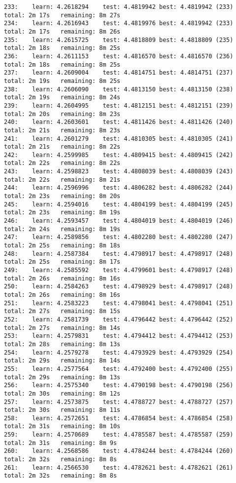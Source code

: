 \documentclass[11pt]{article}
\begin{document}
\begin{Verbatim}[commandchars=\\\{\}]
233:	learn: 4.2618294	test: 4.4819942	best: 4.4819942 (233)	total: 2m 17s	remaining: 8m 27s
234:	learn: 4.2616943	test: 4.4819976	best: 4.4819942 (233)	total: 2m 17s	remaining: 8m 26s
235:	learn: 4.2615725	test: 4.4818809	best: 4.4818809 (235)	total: 2m 18s	remaining: 8m 25s
236:	learn: 4.2611153	test: 4.4816570	best: 4.4816570 (236)	total: 2m 18s	remaining: 8m 25s
237:	learn: 4.2609004	test: 4.4814751	best: 4.4814751 (237)	total: 2m 19s	remaining: 8m 25s
238:	learn: 4.2606090	test: 4.4813150	best: 4.4813150 (238)	total: 2m 19s	remaining: 8m 24s
239:	learn: 4.2604995	test: 4.4812151	best: 4.4812151 (239)	total: 2m 20s	remaining: 8m 23s
240:	learn: 4.2603601	test: 4.4811426	best: 4.4811426 (240)	total: 2m 21s	remaining: 8m 23s
241:	learn: 4.2601279	test: 4.4810305	best: 4.4810305 (241)	total: 2m 21s	remaining: 8m 22s
242:	learn: 4.2599985	test: 4.4809415	best: 4.4809415 (242)	total: 2m 22s	remaining: 8m 22s
243:	learn: 4.2598823	test: 4.4808039	best: 4.4808039 (243)	total: 2m 22s	remaining: 8m 21s
244:	learn: 4.2596996	test: 4.4806282	best: 4.4806282 (244)	total: 2m 23s	remaining: 8m 20s
245:	learn: 4.2594016	test: 4.4804199	best: 4.4804199 (245)	total: 2m 23s	remaining: 8m 19s
246:	learn: 4.2593457	test: 4.4804019	best: 4.4804019 (246)	total: 2m 24s	remaining: 8m 19s
247:	learn: 4.2589856	test: 4.4802280	best: 4.4802280 (247)	total: 2m 25s	remaining: 8m 18s
248:	learn: 4.2587384	test: 4.4798917	best: 4.4798917 (248)	total: 2m 25s	remaining: 8m 17s
249:	learn: 4.2585592	test: 4.4799601	best: 4.4798917 (248)	total: 2m 26s	remaining: 8m 16s
250:	learn: 4.2584263	test: 4.4798929	best: 4.4798917 (248)	total: 2m 26s	remaining: 8m 16s
251:	learn: 4.2583223	test: 4.4798041	best: 4.4798041 (251)	total: 2m 27s	remaining: 8m 15s
252:	learn: 4.2581739	test: 4.4796442	best: 4.4796442 (252)	total: 2m 27s	remaining: 8m 14s
253:	learn: 4.2579831	test: 4.4794412	best: 4.4794412 (253)	total: 2m 28s	remaining: 8m 13s
254:	learn: 4.2579278	test: 4.4793929	best: 4.4793929 (254)	total: 2m 29s	remaining: 8m 14s
255:	learn: 4.2577564	test: 4.4792400	best: 4.4792400 (255)	total: 2m 29s	remaining: 8m 13s
256:	learn: 4.2575340	test: 4.4790198	best: 4.4790198 (256)	total: 2m 30s	remaining: 8m 12s
257:	learn: 4.2573875	test: 4.4788727	best: 4.4788727 (257)	total: 2m 30s	remaining: 8m 11s
258:	learn: 4.2572651	test: 4.4786854	best: 4.4786854 (258)	total: 2m 31s	remaining: 8m 10s
259:	learn: 4.2570689	test: 4.4785587	best: 4.4785587 (259)	total: 2m 31s	remaining: 8m 9s
260:	learn: 4.2568586	test: 4.4784244	best: 4.4784244 (260)	total: 2m 32s	remaining: 8m 8s
261:	learn: 4.2566530	test: 4.4782621	best: 4.4782621 (261)	total: 2m 32s	remaining: 8m 8s

\end{Verbatim}
\end{document}
